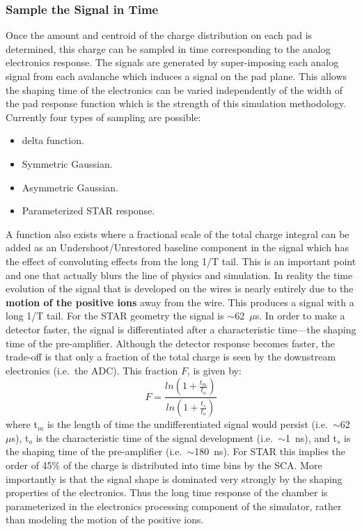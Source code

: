 \documentclass{article}
\begin{document}
\subsubsection{Sample the Signal in Time}

Once the amount and centroid of the charge distribution
on each pad is determined, this charge can be sampled in
time corresponding to the analog electronics response.
The signals are generated by super-imposing each analog signal
from each avalanche which induces a signal on the pad plane.
This allows the shaping
time of the electronics can be varied independently of
the width of the pad response function which is the strength
of this simulation methodology.  Currently four types of
sampling are possible:
\begin{itemize}
  \item delta function.
  \item Symmetric Gaussian.
  \item Asymmetric Gaussian.
  \item Parameterized STAR response.
\end{itemize}
A function also exists where a fractional scale of the total charge integral
can be added as an Undershoot/Unrestored baseline component in the
signal which has the effect of convoluting effects from the long 1/T tail.
This is an important point and one that actually blurs the line of
physics and simulation.  In reality the
time evolution of the signal that is developed on the wires is nearly 
entirely due to the {\bf motion of the positive ions} away from the wire.
This produces a signal with a long 1/T tail.  For the STAR geometry
the signal is $\sim$62~$\mu$s.  In order to make a detector faster,
the signal is differentiated after a characteristic time---the
shaping time of the pre-amplifier.  Although the detector response
becomes faster, the trade-off is that only a fraction of the total
charge is seen by the downstream electronics (i.e.~the ADC).  This
fraction $F$, is given by:
\begin{equation}
  F = \frac{ln(1+\frac{t_{m}}{t_{o}})}{ln(1+\frac{t_{s}}{t_{o}})}
  \label{eq:fraction}
\end{equation}    
where t$_{m}$ is the length of time the undifferentiated signal would
persist (i.e.~$\sim$62~$\mu$s), t$_{o}$ is the characteristic time
of the signal development (i.e.~$\sim$1~ns), and t$_{s}$ is the shaping
time of the pre-amplifier (i.e.~$\sim$180~ns).  For STAR this implies
the order of 45\% of the charge is distributed into time bins by the
SCA.  More importantly is that the signal shape is dominated very strongly
by the shaping properties of the electronics.  Thus the
long time response of the chamber is parameterized in the electronics
processing component of the simulator, rather than modeling the
motion of the positive ions.
\end{document}
